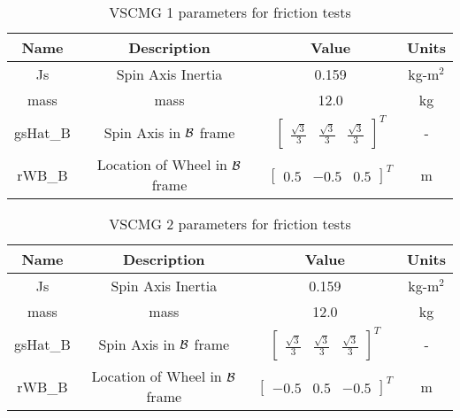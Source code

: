 \begin{table}[htbp]
	\caption{VSCMG 1 parameters for friction tests}
	\label{tab:rwFriction}
	\centering \fontsize{10}{10}\selectfont
	\begin{tabular}{ c | c | c | c } %
		\hline
		\textbf{Name}  & \textbf{Description}  & \textbf{Value} & \textbf{Units} \\
		\hline
		Js  & Spin Axis Inertia & 0.159 & kg-m$^2$ \\
		mass & mass & 12.0 & kg \\
		gsHat\_B & Spin Axis in $\cal{B}$ frame & $\begin{bmatrix}
		\frac{\sqrt{3}}{3} & \frac{\sqrt{3}}{3} & \frac{\sqrt{3}}{3} \end{bmatrix}^T$ & - \\
		rWB\_B & Location of Wheel in $\cal{B}$ frame & $\begin{bmatrix}
		0.5 & -0.5 & 0.5 \end{bmatrix}^T$ & m \\
		\hline
	\end{tabular}
\end{table}

\begin{table}[htbp]
	\caption{VSCMG 2 parameters for friction tests}
	\label{tab:rwFriction2}
	\centering \fontsize{10}{10}\selectfont
	\begin{tabular}{ c | c | c | c } %
		\hline
		\textbf{Name}  & \textbf{Description}  & \textbf{Value} & \textbf{Units} \\
		\hline
		Js  & Spin Axis Inertia & 0.159 & kg-m$^2$ \\
		mass & mass & 12.0 & kg \\
		gsHat\_B & Spin Axis in $\cal{B}$ frame & $\begin{bmatrix}
		\frac{\sqrt{3}}{3} & \frac{\sqrt{3}}{3} & \frac{\sqrt{3}}{3} \end{bmatrix}^T$ & - \\
		rWB\_B & Location of Wheel in $\cal{B}$ frame & $\begin{bmatrix}
		-0.5 & 0.5 & -0.5 \end{bmatrix}^T$ & m \\
		\hline
	\end{tabular}
\end{table}

